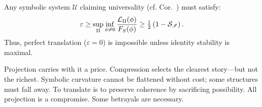 \begin{corollary}
\label{corollary:bk8_bound_on_universal_embedding}
Any symbolic system $\mathscr{U}$ claiming universality (cf. Cor.~) must satisfy:
\[
\varepsilon \ge \sup_\Pi \inf_{\phi \neq 0} \frac{\mathcal{L}_\Pi(\phi)}{F_S(\phi)} 
\ge \tfrac{1}{2} \left(1 - \mathcal{S}_{\mathscr{I}}\right).
\]
Thus, perfect translation ($\varepsilon = 0$) is impossible unless identity stability is maximal.
\end{corollary}
\begin{scholium}
\label{scholium:bk8_telephone_game}
Projection carries with it a price.  
Compression selects the clearest story—but not the richest.  
Symbolic curvature cannot be flattened without cost; some structures must fall away.  
To translate is to preserve coherence by sacrificing possibility.  
All projection is a compromise. Some betrayals are necessary.  
\end{scholium}
